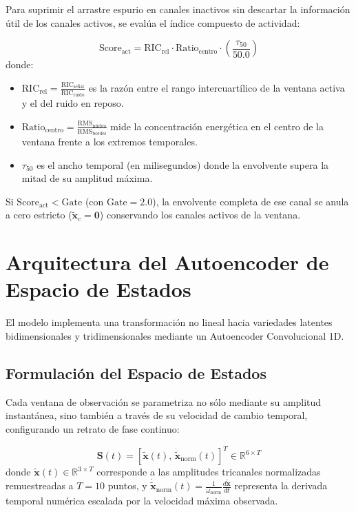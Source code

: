 \documentclass[11pt,a4paper,openany]{book}
\theoremstyle{definition}
\begin{document}
Para suprimir el arrastre espurio en canales inactivos sin descartar la información útil de los canales activos, se evalúa el índice compuesto de actividad:

\begin{equation}
    \text{Score}_{\text{act}} = \text{RIC}_{\text{rel}} \cdot \text{Ratio}_{\text{centro}} \cdot \left( \frac{\tau_{50}}{50.0} \right)
    \label{eq:score_act}
\end{equation}
donde:
\begin{itemize}
    \item $\text{RIC}_{\text{rel}} = \frac{\text{RIC}_{\text{señal}}}{\text{RIC}_{\text{ruido}}}$ es la razón entre el rango intercuartílico de la ventana activa y el del ruido en reposo.
    \item $\text{Ratio}_{\text{centro}} = \frac{\text{RMS}_{\text{núcleo}}}{\text{RMS}_{\text{bordes}}}$ mide la concentración energética en el centro de la ventana frente a los extremos temporales.
    \item $\tau_{50}$ es el ancho temporal (en milisegundos) donde la envolvente supera la mitad de su amplitud máxima.
\end{itemize}
Si $\text{Score}_{\text{act}} < \text{Gate}$ (con $\text{Gate} = 2.0$), la envolvente completa de ese canal se anula a cero estricto ($\tilde{\mathbf{x}}_c = \mathbf{0}$) conservando los canales activos de la ventana.

\section{Arquitectura del Autoencoder de Espacio de Estados}
\label{sec:arquitectura_red}

El modelo implementa una transformación no lineal hacia variedades latentes bidimensionales y tridimensionales mediante un Autoencoder Convolucional 1D.

\subsection{Formulación del Espacio de Estados}
\label{subsec:espacio_estados}

Cada ventana de observación se parametriza no sólo mediante su amplitud instantánea, sino también a través de su velocidad de cambio temporal, configurando un retrato de fase continuo:

\begin{equation}
    \mathbf{S}(t) = \left[ \tilde{\mathbf{x}}(t),\, \dot{\tilde{\mathbf{x}}}_{\text{norm}}(t) \right]^T \in \mathbb{R}^{6 \times T}
    \label{eq:estado_cinematico}
\end{equation}
donde $\tilde{\mathbf{x}}(t) \in \mathbb{R}^{3 \times T}$ corresponde a las amplitudes tricanales normalizadas remuestreadas a $T = 10$ puntos, y $\dot{\tilde{\mathbf{x}}}_{\text{norm}}(t) = \frac{1}{\omega_{\text{norm}}} \frac{d\tilde{\mathbf{x}}}{dt}$ representa la derivada temporal numérica escalada por la velocidad máxima observada.
\end{document}

